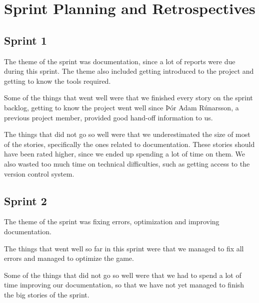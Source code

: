 \section{Sprint Planning and Retrospectives}\label{sec:retrospectives}

\subsection{Sprint 1}
The theme of the sprint was documentation, since a lot of reports were due during this sprint. The theme also included getting introduced to the project and getting to know the tools required.


Some of the things that went well were that we finished every story on the sprint backlog, getting to know the project went well since Þór Adam Rúnarsson, a previous project member, provided good hand-off information to us.


The things that did not go so well were that we underestimated the size of most of the stories, specifically the ones related to documentation. These stories should have been rated higher, since we ended up spending a lot of time on them. We also wasted too much time on technical difficulties, such as getting access to the version control system. 

\subsection{Sprint 2}
The theme of the sprint was fixing errors, optimization and improving documentation.

The things that went well so far in this sprint were that we managed to fix all errors and managed to optimize the game. 

Some of the things that did not go so well were that we had to spend a lot of time improving our documentation, so that we have not yet managed to finish the big stories of the sprint.